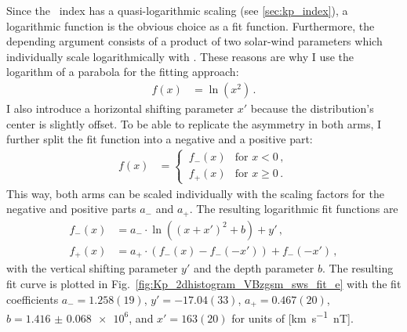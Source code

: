 
Since the \Kp~index has a quasi-logarithmic scaling (see \autoref{sec:kp_index}), a logarithmic function is the obvious choice as a fit function. Furthermore, the depending argument consists of a product of two solar-wind parameters which individually scale logarithmically with \Kp{}. These reasons are why I use the logarithm of a parabola for the fitting approach:
\begin{align}
	f(x) &= \ln\left(x^2\right)	\,.	\label{eq:log_square_function}
\end{align}
I also introduce a horizontal shifting parameter $x'$ because the distribution's center is slightly offset. To be able to replicate the asymmetry in both arms, I further split the fit function into a negative and a positive part:
\begin{align}
	f(x) &=
	\begin{cases}
		\,f_-(x) &\text{for } x < 0	\,,\\
		\,f_+(x) &\text{for } x \ge 0	\,.
	\end{cases}	\label{eq:log_square_fit_function}
\end{align}
This way, both arms can be scaled individually with the scaling factors for the negative and positive parts $a_-$ and $a_+$. The resulting logarithmic fit functions are
\begin{align}
	f_-(x) &= a_- \cdot \ln\left(\left(x + x'\right)^2 + b\right) + y'	\,,\\
	f_+(x) &= a_+ \cdot \left(f_-(x) - f_-\left(-x'\right)\right) + f_-\left(-x'\right)	\,,
\end{align}
with the vertical shifting parameter $y'$ and the depth parameter $b$. The resulting fit curve is plotted in Fig.~\ref{fig:Kp_2dhistogram_VBzgsm_sws_fit_e} with the fit coefficients $a_- = 1.258(19)$, $y' = -17.04(33)$, $a_+ = 0.467(20)$, $b = \num{1.416(68)e6}$, and $x' = 163(20)$ for units of [\si{\km\per\s \nano\tesla}].
